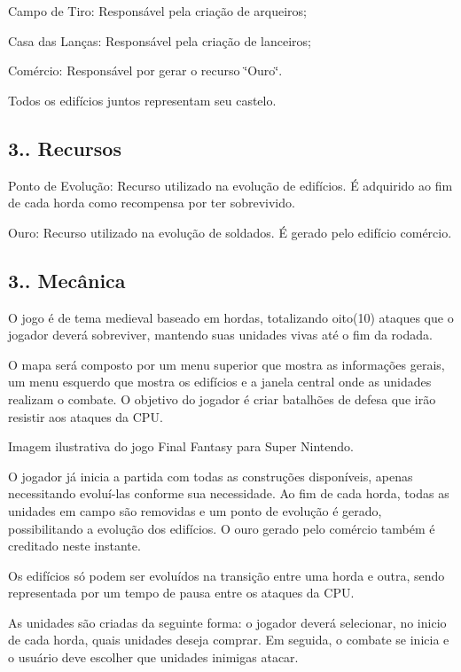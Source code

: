  \-Campo de \-Tiro\-: \-Responsável pela criação de arqueiros;\par
 \-Casa das \-Lanças\-: \-Responsável pela criação de lanceiros;\par
 \-Comércio\-: \-Responsável por gerar o recurso \char`\"{}\-Ouro\char`\"{}.\par
 \-Todos os edifícios juntos representam seu castelo.\par
 \hypertarget{index_recursos}{}\subsection{3.. Recursos}\label{index_recursos}
\-Ponto de \-Evolução\-: \-Recurso utilizado na evolução de edifícios. É adquirido ao fim de cada horda como recompensa por ter sobrevivido.\par
 \-Ouro\-: \-Recurso utilizado na evolução de soldados. É gerado pelo edifício comércio.\par
 \hypertarget{index_mecanica}{}\subsection{3.. Mecânica}\label{index_mecanica}
\-O jogo é de tema medieval baseado em hordas, totalizando oito(10) ataques que o jogador deverá sobreviver, mantendo suas unidades vivas até o fim da rodada.\par
 \-O mapa será composto por um menu superior que mostra as informações gerais, um menu esquerdo que mostra os edifícios e a janela central onde as unidades realizam o combate. \-O objetivo do jogador é criar batalhões de defesa que irão resistir aos ataques da \-C\-P\-U.\par
  \-Imagem ilustrativa do jogo \-Final \-Fantasy para \-Super \-Nintendo.\par
\par
 \-O jogador já inicia a partida com todas as construções disponíveis, apenas necessitando evoluí-\/las conforme sua necessidade. \-Ao fim de cada horda, todas as unidades em campo são removidas e um ponto de evolução é gerado, possibilitando a evolução dos edifícios. \-O ouro gerado pelo comércio também é creditado neste instante.\par
 \-Os edifícios só podem ser evoluídos na transição entre uma horda e outra, sendo representada por um tempo de pausa entre os ataques da \-C\-P\-U.\par
 \-As unidades são criadas da seguinte forma\-: o jogador deverá selecionar, no inicio de cada horda, quais unidades deseja comprar. \-Em seguida, o combate se inicia e o usuário deve escolher que unidades inimigas atacar.\par
